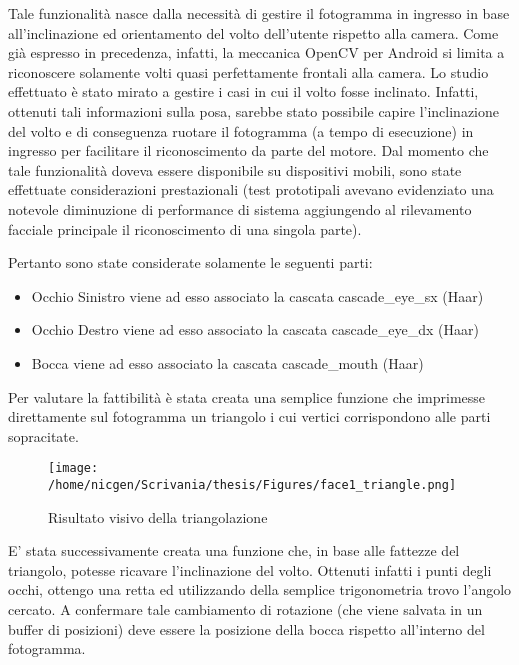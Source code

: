Tale funzionalità nasce dalla necessità di gestire il fotogramma in ingresso in base all'inclinazione ed orientamento del volto dell'utente rispetto alla camera. Come già espresso in precedenza, infatti, la meccanica OpenCV per Android si limita a riconoscere solamente volti quasi perfettamente frontali alla camera. Lo studio effettuato è stato mirato a gestire i casi in cui il volto fosse inclinato. Infatti, ottenuti tali informazioni sulla posa, sarebbe stato possibile capire l'inclinazione del volto e di conseguenza ruotare il fotogramma (a tempo di esecuzione) in ingresso per facilitare il riconoscimento da parte del motore. Dal momento che tale funzionalità doveva essere disponibile su dispositivi mobili, sono state effettuate considerazioni prestazionali (test prototipali avevano evidenziato una notevole diminuzione di performance di sistema aggiungendo al rilevamento facciale principale il riconoscimento di una singola parte). 

Pertanto sono state considerate solamente le seguenti parti:

\begin{itemize}
\item Occhio Sinistro viene ad esso associato la cascata cascade\_eye\_sx (Haar)
\item Occhio Destro viene ad esso associato la cascata cascade\_eye\_dx (Haar)
\item Bocca viene ad esso associato la cascata cascade\_mouth (Haar)
\end{itemize}

Per valutare la fattibilità è stata creata una semplice funzione che imprimesse direttamente sul fotogramma un triangolo i cui vertici corrispondono alle parti sopracitate.

\begin{figure}[H]\centering  
\texttt{[image: /home/nicgen/Scrivania/thesis/Figures/face1\_triangle.png]}
\caption[Risultato visivo della triangolazione]{Risultato visivo della triangolazione}
\label{pic-a}
\end{figure}

E' stata successivamente creata una funzione che, in base alle fattezze del triangolo, potesse ricavare l'inclinazione del volto. Ottenuti infatti i punti degli occhi, ottengo una retta ed utilizzando della semplice trigonometria trovo l'angolo cercato. A confermare tale cambiamento di rotazione (che viene salvata in un buffer di posizioni) deve essere la posizione della bocca rispetto all'interno del fotogramma.

